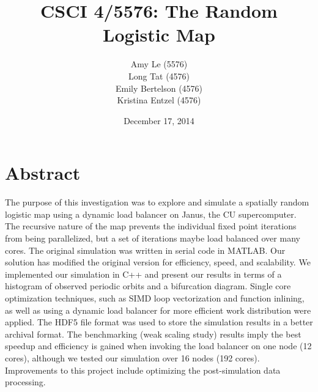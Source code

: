 \documentclass[12pt]{article}
\begin{document}
\pagestyle{plain} %
\title{CSCI 4/5576: The Random Logistic Map}
\date{December 17, 2014}
\author{Amy Le (5576)\\Long Tat (4576)\\Emily Bertelson (4576)\\Kristina Entzel (4576)}
\maketitle
\section{Abstract}
The purpose of this investigation was to explore and simulate a
spatially random logistic map using a dynamic load balancer on Janus, the CU
supercomputer. The recursive nature of the map prevents the individual
fixed point iterations from being parallelized, but a set of
iterations maybe load balanced over many cores. The original simulation was written in serial code in
MATLAB. Our solution has modified the original version for efficiency,
speed, and scalability. We implemented our simulation in C++ and present our
results in terms of a histogram of observed periodic orbits and a
bifurcation diagram. Single core optimization techniques,
such as SIMD loop vectorization and function inlining, as well as
using a dynamic load balancer for more efficient work distribution
were applied. The HDF5 file format was used to store the simulation results in a better archival format. The benchmarking (weak scaling study) results imply the best
speedup and efficiency is gained when invoking the load balancer on
one node (12 cores), although we tested our simulation over 16 nodes
(192 cores). Improvements to this project include optimizing the
post-simulation data processing. 
\end{document}
